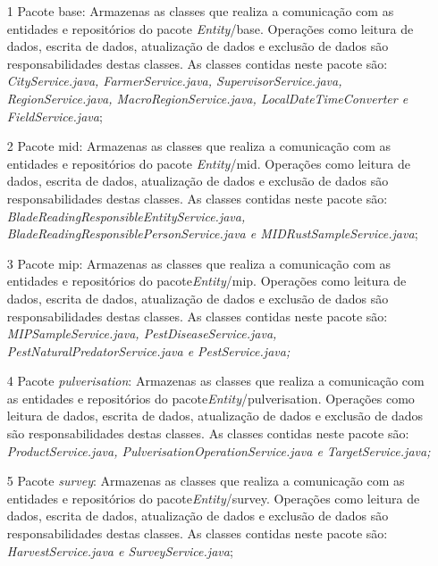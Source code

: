 \begin{itemize}

\item[1] Pacote base: Armazenas as classes que realiza a comunicação com as entidades e repositórios do pacote \textit{Entity}/base. Operações como leitura de dados, escrita de dados, atualização de dados e exclusão de dados são responsabilidades destas classes. As classes contidas neste pacote são: \textit{CityService.java, FarmerService.java, SupervisorService.java, RegionService.java, MacroRegionService.java, LocalDateTimeConverter e FieldService.java};  

\item[2] Pacote mid: Armazenas as classes que realiza a comunicação com as entidades e repositórios do pacote \textit{Entity}/mid. Operações como leitura de dados, escrita de dados, atualização de dados e exclusão de dados são responsabilidades destas classes. As classes contidas neste pacote são: \textit{BladeReadingResponsibleEntityService.java, BladeReadingResponsiblePersonService.java e MIDRustSampleService.java};

\item[3] Pacote mip: Armazenas as classes que realiza a comunicação com as entidades e repositórios do pacote\textit{Entity}/mip. Operações como leitura de dados, escrita de dados, atualização de dados e exclusão de dados são responsabilidades destas classes. As classes contidas neste pacote são: \textit{MIPSampleService.java, PestDiseaseService.java, PestNaturalPredatorService.java e PestService.java;}

\item[4] Pacote \textit{pulverisation}: Armazenas as classes que realiza a comunicação com as entidades e repositórios do pacote\textit{Entity}/pulverisation. Operações como leitura de dados, escrita de dados, atualização de dados e exclusão de dados são responsabilidades destas classes. As classes contidas neste pacote são: \textit{ProductService.java, PulverisationOperationService.java e TargetService.java;}

\item[5] Pacote \textit{survey}: Armazenas as classes que realiza a comunicação com as entidades e repositórios do pacote\textit{Entity}/survey. Operações como leitura de dados, escrita de dados, atualização de dados e exclusão de dados são responsabilidades destas classes. As classes contidas neste pacote são: \textit{HarvestService.java e SurveyService.java};

\end{itemize}

